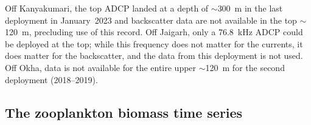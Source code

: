 \documentclass[authoryear,review,11pt]{elsarticle}
\begin{document}
Off Kanyakumari, the top ADCP landed at a depth of $\sim$300~m in the last deployment in January~2023 and backscatter data are not available in the top $\sim$120~m, precluding use of this record.  Off Jaigarh, only a 76.8~kHz ADCP could be deployed at the top; while this frequency does not matter for the currents, it does matter for the backscatter, and the data from this deployment is not used. Off Okha, data is not available for the entire upper $\sim$120~m for the
second deployment (2018--2019).



\subsection{The zooplankton biomass time series}
\label{sec:data.biomass}
\end{document}
